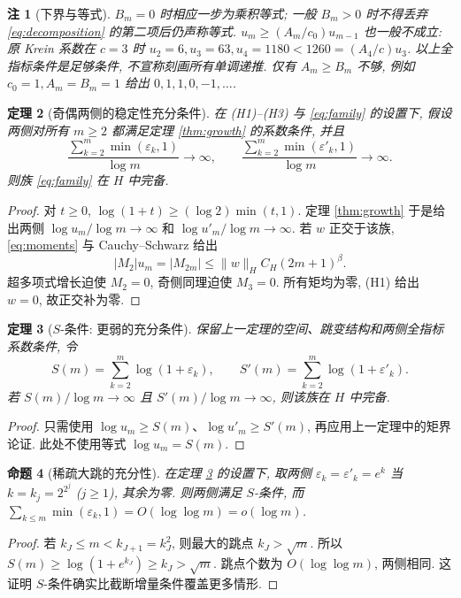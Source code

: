 \documentclass[UTF8]{ctexart}
\newtheorem{theorem}{定理}[section]
\newtheorem{remark}[theorem]{注}
\newtheorem{proposition}[theorem]{命题}
\begin{document}
\begin{remark}[下界与等式]
$B_m=0$ 时相应一步为乘积等式; 一般 $B_m>0$ 时不得丢弃
\eqref{eq:decomposition} 的第二项后仍声称等式.
$u_m\ge (A_m/c_0)u_{m-1}$ 也一般不成立:
原 Krein 系数在 $c=3$ 时 $u_2=6,u_3=63,u_4=1180<1260=(A_4/c)u_3$.
以上全指标条件是足够条件, 不宣称刻画所有单调递推.
仅有 $A_m\ge B_m$ 不够, 例如 $c_0=1,A_m=B_m=1$
给出 $0,1,1,0,-1,\ldots$.
\end{remark}

\begin{theorem}[奇偶两侧的稳定性充分条件]\label{thm:stability}
在 (H1)--(H3) 与 \eqref{eq:family} 的设置下, 假设两侧对所有 $m\ge2$
都满足定理 \ref{thm:growth} 的系数条件, 并且
\[
\frac{\sum_{k=2}^m\min(\varepsilon_k,1)}{\log m}\longrightarrow\infty,
\qquad
\frac{\sum_{k=2}^m\min(\varepsilon'_k,1)}{\log m}\longrightarrow\infty .
\]
则族 \eqref{eq:family} 在 $H$ 中完备.
\end{theorem}
\begin{proof}
对 $t\ge0$, $\log(1+t)\ge(\log2)\min(t,1)$.
定理 \ref{thm:growth} 于是给出两侧 $\log u_m/\log m\to\infty$
和 $\log u'_m/\log m\to\infty$.
若 $w$ 正交于该族, \eqref{eq:moments} 与 Cauchy--Schwarz 给出
\[
|M_2|u_m=|M_{2m}|\le \|w\|_H C_H(2m+1)^\beta .
\]
超多项式增长迫使 $M_2=0$, 奇侧同理迫使 $M_3=0$.
所有矩均为零, (H1) 给出 $w=0$, 故正交补为零.
\end{proof}

\begin{theorem}[$S$-条件: 更弱的充分条件]\label{thm:Sthr}
保留上一定理的空间、跳变结构和两侧全指标系数条件, 令
\[
S(m)=\sum_{k=2}^m\log(1+\varepsilon_k),\qquad
S'(m)=\sum_{k=2}^m\log(1+\varepsilon'_k).
\]
若 $S(m)/\log m\to\infty$ 且 $S'(m)/\log m\to\infty$,
则该族在 $H$ 中完备.
\end{theorem}
\begin{proof}
只需使用 $\log u_m\ge S(m)$、$\log u'_m\ge S'(m)$,
再应用上一定理中的矩界论证. 此处不使用等式 $\log u_m=S(m)$.
\end{proof}

\begin{proposition}[稀疏大跳的充分性]\label{prop:sparse}
在定理 \ref{thm:Sthr} 的设置下, 取两侧
$\varepsilon_k=\varepsilon'_k=e^k$ 当 $k=k_j=2^{2^j}$ ($j\ge1$),
其余为零. 则两侧满足 $S$-条件, 而
$\sum_{k\le m}\min(\varepsilon_k,1)=O(\log\log m)=o(\log m)$.
\end{proposition}
\begin{proof}
若 $k_J\le m<k_{J+1}=k_J^2$, 则最大的跳点 $k_J>\sqrt m$.
所以 $S(m)\ge\log(1+e^{k_J})\ge k_J>\sqrt m$.
跳点个数为 $O(\log\log m)$, 两侧相同.
这证明 $S$-条件确实比截断增量条件覆盖更多情形.
\end{proof}
\end{document}
